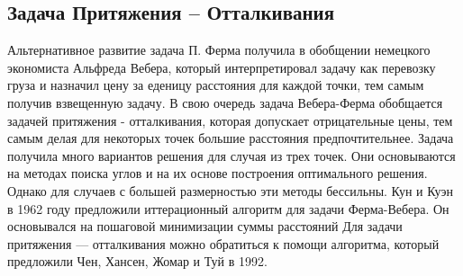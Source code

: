 \subsection{Задача Притяжения – Отталкивания}
\tab Альтернативное развитие задача П. Ферма получила в обобщении немецкого экономиста Альфреда Вебера, который интерпретировал задачу как перевозку груза и назначил цену за еденицу расстояния для каждой точки, тем самым получив взвещенную задачу.
\newline
\tab В свою очередь задача Вебера-Ферма обобщается задачей притяжения - отталкивания, которая допускает отрицательные цены, тем самым делая для некоторых точек большие расстояния предпочтительнее. 
\newline
\tab Задача получила много вариантов решения для случая из трех точек. Они основываются на методах поиска углов и на их основе построения оптимального решения. Однако для случаев с большей размерностью эти методы бессильны. 
\newline
\tab Кун и Куэн в 1962 году предложили иттерационный алгоритм для задачи Ферма-Вебера. Он основывался на пошаговой минимизации суммы расстояний
\newline
\tab  Для задачи притяжения — отталкивания можно обратиться к помощи алгоритма, который предложили Чен, Хансен, Жомар и Туй в 1992.  
\newpage